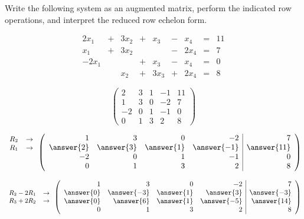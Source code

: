 \documentclass{ximera}
\begin{document}
\begin{exercise}
Write the following system as an augmented matrix, perform the indicated row operations, and interpret the reduced row echelon form. 

\[
\begin{array}{rcrcrcrcrc}
 2x_1 & + & 3x_2 & + & x_3  & - &  x_4 & = & 11 \\
 x_1  & + & 3x_2 &   &      & - & 2x_4 & = &  7 \\
-2x_1 &   &      & + & x_3  & - &  x_4 & = &  0 \\
      &   & x_2  & + & 3x_3 & + & 2x_4 & = &  8
\end{array}
\]

\begin{prompt}
\[
\left(\begin{array}{rrrr|r}
     2 &  3 &  1 &  -1 & 11 \\
     1 &  3 &  0 &  -2 &  7 \\
    -2 &  0 &  1 &  -1 &  0 \\
     0 &  1 &  3 &   2 &  8 
\end{array}\right)
\]

\[
{\small
\begin{array}{lr}
R_2 & \rightarrow  \\
R_1 & \rightarrow  \\  
    &   \\
    &   \\  
\end{array}
}
\left(\begin{array}{rrrr|r}
     1 &  3 &  0 &  -2 &  7 \\
     \answer{2} &  \answer{3} &  \answer{1} &  \answer{-1} & \answer{11} \\
    -2 &  0 &  1 &  -1 &  0 \\
     0 &  1 &  3 &   2 &  8 
\end{array}\right)
\]

\[
{\small
\begin{array}{lr}
  &    \\  
R_2-2R_1  & \rightarrow  \\
R_3 + 2R_2  & \rightarrow  \\
  &   \\  
\end{array}
}
\left(\begin{array}{rrrr|r}
     1 &  3 &  0 &  -2 &  7 \\
     \answer{0} &  \answer{-3} &  \answer{1} &  \answer{3} & \answer{-3} \\
     \answer{0} &  \answer{6} &  \answer{1} &  \answer{-5} &  \answer{14} \\
     0 &  1 &  3 &   2 &  8 
\end{array}\right)
\]


\end{prompt}
\end{exercise}
\end{document}
